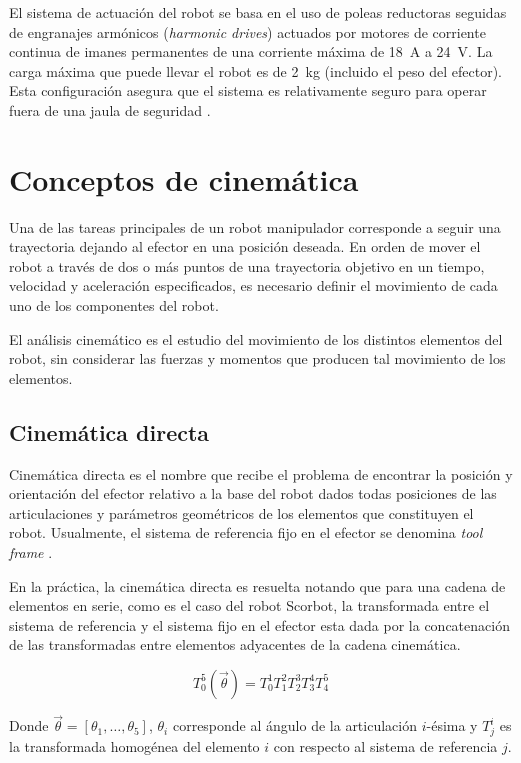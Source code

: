 El sistema de actuación del robot se basa en el uso de poleas reductoras seguidas de engranajes armónicos (\textit{harmonic drives}) actuados por motores de corriente continua de imanes permanentes de una corriente máxima de \SI{18}{\ampere} a \SI{24}{\volt}. La carga máxima que puede llevar el robot es de \SI{2}{\kilo\gram} (incluido el peso del efector). Esta configuración asegura que el sistema es relativamente seguro para operar fuera de una jaula de seguridad \cite{scorbot1998}.

\section{Conceptos de cinemática}

Una de las tareas principales de un robot manipulador corresponde a seguir una trayectoria dejando al efector en una posición deseada. En orden de mover el robot a través de dos o más puntos de una trayectoria objetivo en un tiempo, velocidad y aceleración especificados, es necesario definir el movimiento de cada uno de los componentes del robot.

El análisis cinemático es el estudio del movimiento de los distintos elementos del robot, sin considerar las fuerzas y momentos que producen tal movimiento de los elementos.

\subsection{Cinemática directa}

Cinemática directa es el nombre que recibe el problema de encontrar la posición y orientación del efector relativo a la base del robot dados todas posiciones de las articulaciones y parámetros geométricos de los elementos que constituyen el robot. Usualmente, el sistema de referencia fijo en el efector se denomina \textit{tool frame} \cite{handbook}.

En la práctica, la cinemática directa es resuelta notando que para una cadena de elementos en serie, como es el caso del robot Scorbot, la transformada entre el sistema de referencia y el sistema fijo en el efector esta dada por la concatenación de las transformadas entre elementos adyacentes de la cadena cinemática.

\begin{equation}
T_0^5(\vec{\theta}) = T_0^1 T_1^2 T_2^3 T_3^4 T_4^5 
\end{equation}

Donde $\vec{\theta}=[\theta_1,\dotsc,\theta_5]$, $\theta_i$ corresponde al ángulo de la articulación $i$-ésima y $T_j^i$ es la transformada homogénea del elemento $i$ con respecto al sistema de referencia $j$.

